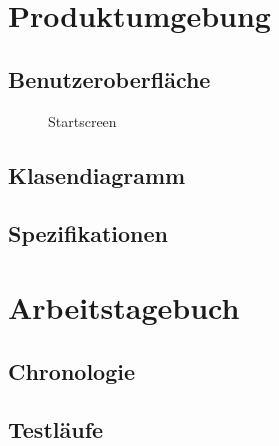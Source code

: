 \documentclass{article}
\begin{document}

\newpage
\section{Produktumgebung}\label{section-product}

\subsection{Benutzeroberfläche}

\begin{figure}[h]
    \centering
    \caption{Startscreen}
\end{figure}

\subsection{Klasendiagramm}
\subsection{Spezifikationen}


\newpage
\section{Arbeitstagebuch}\label{section-diary}

\subsection{Chronologie}
\subsection{Testläufe}


\end{document}
